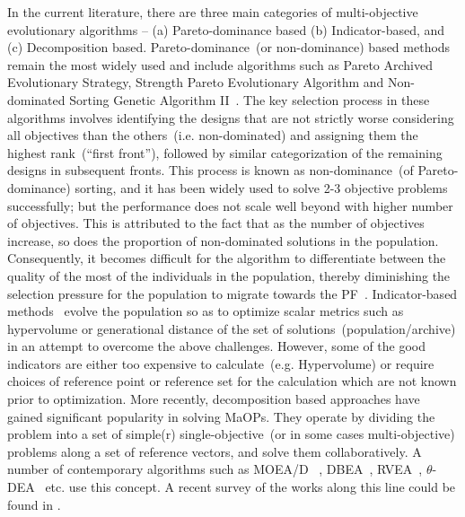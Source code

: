\documentclass[twocolumn,10pt]{asme2ej}
\begin{document}
In the current literature, there are three main categories of multi-objective evolutionary algorithms -- (a) Pareto-dominance based (b) Indicator-based, and (c) Decomposition based.  Pareto-dominance~(or non-dominance) based methods remain the most widely used and include algorithms such as Pareto Archived Evolutionary Strategy, Strength Pareto Evolutionary Algorithm and Non-dominated Sorting Genetic Algorithm II~\cite{deb2001multi}. The key selection process in these algorithms involves identifying the designs that are not strictly worse considering all objectives than the others~(i.e. non-dominated) and assigning them the highest rank~(``first front''), followed by similar categorization of the remaining designs in subsequent fronts. This process is known as non-dominance~(of Pareto-dominance) sorting, and it has been widely used to solve 2-3 objective problems successfully; but the performance does not scale well beyond with higher number of objectives. This is attributed to the fact that as the number of objectives increase, so does the proportion of non-dominated solutions in the population. Consequently, it becomes difficult for the algorithm to differentiate between the quality of the most of the individuals in the population, thereby diminishing the selection pressure for the population to migrate towards the PF~\cite{KHTishibuchi2008evolutionary,KHTli2015many}. Indicator-based methods~\cite{zitzler2004indicator} evolve the population so as to optimize scalar metrics such as hypervolume or generational distance of the set of solutions~(population/archive) in an attempt to overcome the above challenges. However, some of the good indicators are either too expensive to calculate~(e.g. Hypervolume) or require choices of reference point or reference set for the calculation which are not known prior to optimization. More recently, decomposition based approaches have gained significant popularity in solving MaOPs. They operate by dividing the problem into a set of simple(r) single-objective~(or in some cases multi-objective) problems along a set of reference vectors, and solve them collaboratively. A number of contemporary algorithms such as MOEA/D~ \cite{KHTzhang2007moead}, DBEA~\cite{Asafuddoula2015}, RVEA~\cite{KHTCheng2016many}, $\theta$-DEA~\cite{KHTYuan2016many} etc. use this concept. A recent survey of the works along this line could be found in \cite{KHTtrivedisurvey}. 
\end{document}
